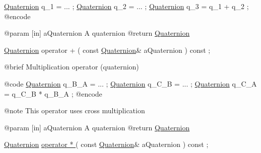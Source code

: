 \begin{DoxyCode}
                        \hyperlink{classostk_1_1math_1_1geom_1_1d3_1_1trf_1_1rot_1_1_quaternion_ad9fd7d8eb5effb4d4e0394bbb5bb86dc}{Quaternion} q\_1 = ... ;
                        \hyperlink{classostk_1_1math_1_1geom_1_1d3_1_1trf_1_1rot_1_1_quaternion_ad9fd7d8eb5effb4d4e0394bbb5bb86dc}{Quaternion} q\_2 = ... ;
                        \hyperlink{classostk_1_1math_1_1geom_1_1d3_1_1trf_1_1rot_1_1_quaternion_ad9fd7d8eb5effb4d4e0394bbb5bb86dc}{Quaternion} q\_3 = q\_1 + q\_2 ;
    @encode
   
    @param              [in] aQuaternion A quaternion
    @\textcolor{keywordflow}{return}             \hyperlink{classostk_1_1math_1_1geom_1_1d3_1_1trf_1_1rot_1_1_quaternion_ad9fd7d8eb5effb4d4e0394bbb5bb86dc}{Quaternion}

\hyperlink{classostk_1_1math_1_1geom_1_1d3_1_1trf_1_1rot_1_1_quaternion_ad9fd7d8eb5effb4d4e0394bbb5bb86dc}{Quaternion}              operator +                                  (   \textcolor{keyword}{const}   
      \hyperlink{classostk_1_1math_1_1geom_1_1d3_1_1trf_1_1rot_1_1_quaternion_ad9fd7d8eb5effb4d4e0394bbb5bb86dc}{Quaternion}&                 aQuaternion                                 ) \textcolor{keyword}{const} ;

    @brief              Multiplication operator (quaternion)
   
    @code
                        \hyperlink{classostk_1_1math_1_1geom_1_1d3_1_1trf_1_1rot_1_1_quaternion_ad9fd7d8eb5effb4d4e0394bbb5bb86dc}{Quaternion} q\_B\_A = ... ;
                        \hyperlink{classostk_1_1math_1_1geom_1_1d3_1_1trf_1_1rot_1_1_quaternion_ad9fd7d8eb5effb4d4e0394bbb5bb86dc}{Quaternion} q\_C\_B = ... ;
                        \hyperlink{classostk_1_1math_1_1geom_1_1d3_1_1trf_1_1rot_1_1_quaternion_ad9fd7d8eb5effb4d4e0394bbb5bb86dc}{Quaternion} q\_C\_A = q\_C\_B * q\_B\_A ;
    @encode
   
    @note               This \textcolor{keyword}{operator} uses cross multiplication
   
    @param              [in] aQuaternion A quaternion
    @\textcolor{keywordflow}{return}             \hyperlink{classostk_1_1math_1_1geom_1_1d3_1_1trf_1_1rot_1_1_quaternion_ad9fd7d8eb5effb4d4e0394bbb5bb86dc}{Quaternion}

\hyperlink{classostk_1_1math_1_1geom_1_1d3_1_1trf_1_1rot_1_1_quaternion_ad9fd7d8eb5effb4d4e0394bbb5bb86dc}{Quaternion}              \hyperlink{classostk_1_1math_1_1geom_1_1d3_1_1trf_1_1rot_1_1_quaternion_a26bf54c393d70c812538b119d4cb10a3}{operator *                                  }
      (   \textcolor{keyword}{const}   \hyperlink{classostk_1_1math_1_1geom_1_1d3_1_1trf_1_1rot_1_1_quaternion_ad9fd7d8eb5effb4d4e0394bbb5bb86dc}{Quaternion}&                 aQuaternion                                 ) \textcolor{keyword}{const} ;


\end{DoxyCode}
